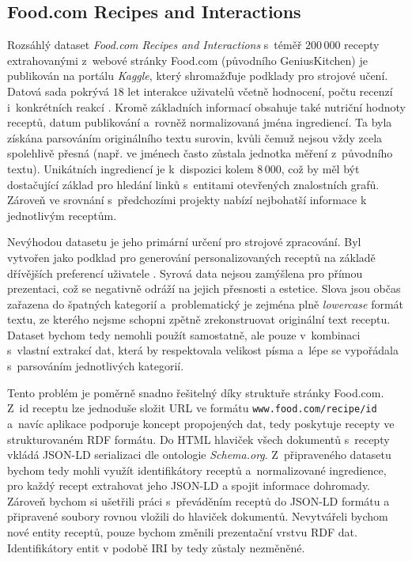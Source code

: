 \subsection{Food.com Recipes and Interactions}

Rozsáhlý dataset \emph{Food.com Recipes and Interactions} s~téměř $200\,000$ recepty extrahovanými z~webové stránky Food.com (původního GeniusKitchen) je publikován na portálu \emph{Kaggle}, který shromažďuje podklady pro strojové učení. Datová sada pokrývá $18$ let interakce uživatelů včetně hodnocení, počtu recenzí i~konkrétních reakcí \citep{shuyang_li_2019}. Kromě základních informací obsahuje také nutriční hodnoty receptů, datum publikování a~rovněž normalizovaná jména ingrediencí. Ta byla získána parsováním originálního textu surovin, kvůli čemuž nejsou vždy zcela spolehlivě přesná (např. ve jménech často zůstala jednotka měření z~původního textu). Unikátních ingrediencí je k~dispozici kolem $8\,000$, což by měl být dostačující základ pro hledání linků s~entitami otevřených znalostních grafů. Zároveň ve srovnání s~předchozími projekty nabízí nejbohatší informace k jednotlivým receptům.

Nevýhodou datasetu je jeho primární určení pro strojové zpracování. Byl vytvořen jako podklad pro generování personalizovaných receptů na základě dřívějších preferencí uživatele \citep{majumder-etal-2019-generating}. Syrová data nejsou zamýšlena pro přímou prezentaci, což se negativně odráží na jejich přesnosti a estetice. Slova jsou občas zařazena do špatných kategorií a~problematický je zejména plně \emph{lowercase} formát textu, ze kterého nejsme schopni zpětně zrekonstruovat originální text receptu. Dataset bychom tedy nemohli použít samostatně, ale pouze v~kombinaci s~vlastní extrakcí dat, která by respektovala velikost písma a~lépe se vypořádala s~parsováním jednotlivých kategorií.

Tento problém je poměrně snadno řešitelný díky struktuře stránky Food.com. Z~id receptu lze jednoduše složit URL ve formátu \texttt{www.food.com/recipe/id} a~navíc aplikace podporuje koncept propojených dat, tedy poskytuje recepty ve strukturovaném RDF formátu. Do HTML hlaviček všech dokumentů s~recepty vkládá JSON-LD serializaci dle ontologie \emph{Schema.org}. Z~připraveného datasetu bychom tedy mohli využít identifikátory receptů a~normalizované ingredience, pro každý recept extrahovat jeho JSON-LD a spojit informace dohromady. Zároveň bychom si ušetřili práci s~převáděním receptů do JSON-LD formátu a připravené soubory rovnou vložili do hlaviček dokumentů. Nevytvářeli bychom nové entity receptů, pouze bychom změnili prezentační vrstvu RDF dat. Identifikátory entit v podobě IRI by tedy zůstaly nezměněné.

